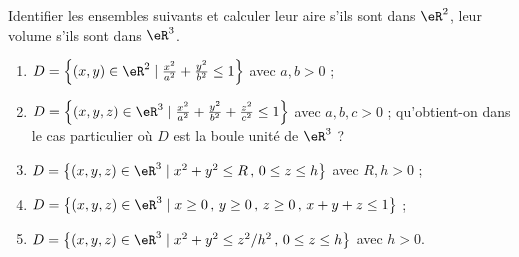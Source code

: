 \begin{exercice}\label{exoIntegralesMultiples0007}

Identifier les ensembles suivants et calculer leur aire s'ils sont dans $\eR^2$, leur volume s'ils sont dans $\eR^3$.
\begin{enumerate}
\item $D=\left\{ (x,y)\in \eR^2 \mid \frac{x^2}{a^2}+\frac{y^2}{b^2} \leq 1 \right\}$ avec $a,b>0$ ;
\item $D=\left\{ (x,y,z)\in \eR^3 \mid \frac{x^2}{a^2}+\frac{y^2}{b^2}+\frac{z^2}{c^2} \leq 1 \right\}$ avec $a,b,c>0$ ; qu'obtient-on dans le cas particulier où $D$ est la boule unité de $\eR^3$ ?
\item $D=\left\{ (x,y,z)\in \eR^3 \mid x^2 +y^2 \leq R\, ,\, 0\leq z\leq h \right\}$ avec $R,h>0$ ;
\item $D=\left\{ (x,y,z)\in \eR^3 \mid x\geq 0\, ,\, y\geq 0\, ,\, z\geq 0\, ,\, x+y+z \leq 1 \right\}$ ;
\item $D=\left\{ (x,y,z)\in \eR^3 \mid x^2+y^2\leq z^2/h^2 \, ,\,  0\leq z\leq h \right\}$ avec
$h>0$.
\end{enumerate}


\end{exercice}
